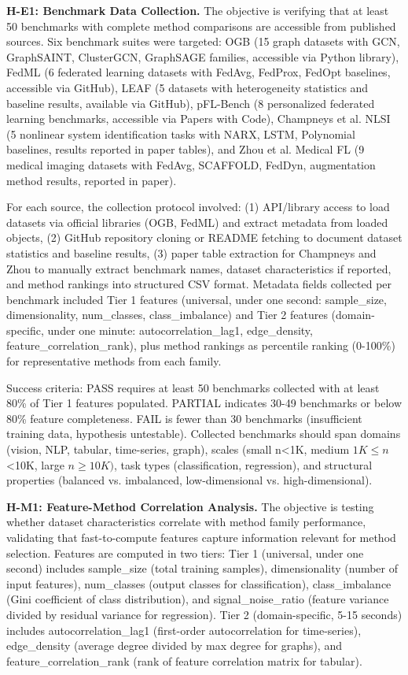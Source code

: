 \textbf{H-E1: Benchmark Data Collection.} The objective is verifying that at least 50 benchmarks with complete method comparisons are accessible from published sources. Six benchmark suites were targeted: OGB (15 graph datasets with GCN, GraphSAINT, ClusterGCN, GraphSAGE families, accessible via Python library), FedML (6 federated learning datasets with FedAvg, FedProx, FedOpt baselines, accessible via GitHub), LEAF (5 datasets with heterogeneity statistics and baseline results, available via GitHub), pFL-Bench (8 personalized federated learning benchmarks, accessible via Papers with Code), Champneys et al. NLSI (5 nonlinear system identification tasks with NARX, LSTM, Polynomial baselines, results reported in paper tables), and Zhou et al. Medical FL (9 medical imaging datasets with FedAvg, SCAFFOLD, FedDyn, augmentation method results, reported in paper).

For each source, the collection protocol involved: (1) API/library access to load datasets via official libraries (OGB, FedML) and extract metadata from loaded objects, (2) GitHub repository cloning or README fetching to document dataset statistics and baseline results, (3) paper table extraction for Champneys and Zhou to manually extract benchmark names, dataset characteristics if reported, and method rankings into structured CSV format. Metadata fields collected per benchmark included Tier 1 features (universal, under one second: sample\_size, dimensionality, num\_classes, class\_imbalance) and Tier 2 features (domain-specific, under one minute: autocorrelation\_lag1, edge\_density, feature\_correlation\_rank), plus method rankings as percentile ranking (0-100\%) for representative methods from each family.

Success criteria: PASS requires at least 50 benchmarks collected with at least 80\% of Tier 1 features populated. PARTIAL indicates 30-49 benchmarks or below 80\% feature completeness. FAIL is fewer than 30 benchmarks (insufficient training data, hypothesis untestable). Collected benchmarks should span domains (vision, NLP, tabular, time-series, graph), scales (small n<1K, medium $1K\leq n$<10K, large $n\geq 10K)$, task types (classification, regression), and structural properties (balanced vs. imbalanced, low-dimensional vs. high-dimensional).

\textbf{H-M1: Feature-Method Correlation Analysis.} The objective is testing whether dataset characteristics correlate with method family performance, validating that fast-to-compute features capture information relevant for method selection. Features are computed in two tiers: Tier 1 (universal, under one second) includes sample\_size (total training samples), dimensionality (number of input features), num\_classes (output classes for classification), class\_imbalance (Gini coefficient of class distribution), and signal\_noise\_ratio (feature variance divided by residual variance for regression). Tier 2 (domain-specific, 5-15 seconds) includes autocorrelation\_lag1 (first-order autocorrelation for time-series), edge\_density (average degree divided by max degree for graphs), and feature\_correlation\_rank (rank of feature correlation matrix for tabular).

